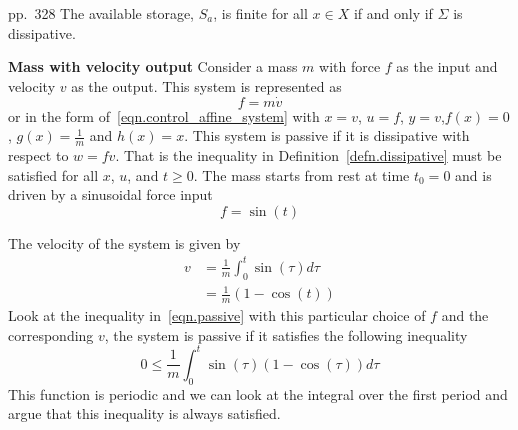 \begin{thm-dan}[{$\;$\hspace{-0.1in}}]\label{thm.storage_dissipative}\cite{willems.part1.1972}
  pp.~328
  The available storage, $S_{a}$, is finite for all $x\in X$ if and only if $\Sigma$ is dissipative.
\end{thm-dan}

\begin{example}
  \textbf{Mass with velocity output}\label{example.massvout}
  Consider a mass $m$ with force $f$ as the input and velocity $v$ as the output.
  This system is represented as
  \begin{equation*}
    f = m \dot{v}
  \end{equation*}
  or in the form of~\eqref{eqn.control_affine_system} with $x=v$, $u=f$, $y=v$,$f(x)=0$, $g(x)=\frac{1}{m}$ and $h(x)=x$.
  This system is passive if it is dissipative with respect to $w=fv$.
  That is the inequality in Definition~\ref{defn.dissipative} must be satisfied for all $x$, $u$, and $t\geq0$.
  The mass starts from rest at time $t_{0}=0$ and is driven by a sinusoidal force input
  \begin{equation*}
    f = \sin (t)
  \end{equation*}

  The velocity of the system is given by
  \begin{equation*}
    \begin{split}
      v &= \frac{1}{m} \int_{0}^{t} \sin (\tau) d\tau \\
      &= \frac{1}{m}(1-\cos (t))
    \end{split}
  \end{equation*}
  Look at the inequality in~\eqref{eqn.passive} with this particular choice of $f$ and the corresponding $v$, the system is passive if it satisfies the following inequality
  \begin{equation*}
    0 \leq \frac{1}{m} \int_{0}^{t} \sin (\tau) (1-\cos (\tau)) d\tau
  \end{equation*}
  This function is periodic and we can look at the integral over the first period and argue that this inequality is always satisfied.
\end{example}

